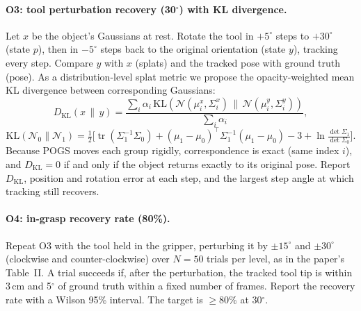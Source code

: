 \documentclass[10pt,a4paper]{article}
\begin{document}
\paragraph{O3: tool perturbation recovery (30$^\circ$) with KL divergence.}
Let $x$ be the object's Gaussians at rest. Rotate the tool in $+5^\circ$ steps to $+30^\circ$
(state $p$), then in $-5^\circ$ steps back to the original orientation (state $y$), tracking every
step. Compare $y$ with $x$ (splats) and the tracked pose with ground truth (pose). As a
distribution-level splat metric we propose the opacity-weighted mean KL divergence between
corresponding Gaussians:
\begin{equation}
D_\text{KL}(x\,\|\,y)=\frac{\sum_i \alpha_i\,\mathrm{KL}\!\left(\mathcal{N}(\mu_i^x,\Sigma_i^x)\,\|\,
\mathcal{N}(\mu_i^y,\Sigma_i^y)\right)}{\sum_i\alpha_i},
\end{equation}
\begin{equation}
\mathrm{KL}(\mathcal{N}_0\|\mathcal{N}_1)=\tfrac12\Big[\operatorname{tr}(\Sigma_1^{-1}\Sigma_0)
+(\mu_1-\mu_0)^\top\Sigma_1^{-1}(\mu_1-\mu_0)-3+\ln\tfrac{\det\Sigma_1}{\det\Sigma_0}\Big].
\end{equation}
Because POGS moves each group rigidly, correspondence is exact (same index $i$), and $D_\text{KL}=0$
if and only if the object returns exactly to its original pose. Report $D_\text{KL}$, position and
rotation error at each step, and the largest step angle at which tracking still recovers.

\paragraph{O4: in-grasp recovery rate (80\%).}
Repeat O3 with the tool held in the gripper, perturbing it by $\pm15^\circ$ and $\pm30^\circ$
(clockwise and counter-clockwise) over $N=50$ trials per level, as in the paper's Table~II.
A trial succeeds if, after the perturbation, the tracked tool tip is within 3\,cm and 5$^\circ$ of
ground truth within a fixed number of frames. Report the recovery rate with a Wilson 95\% interval.
The target is $\ge80\%$ at 30$^\circ$.
\end{document}
